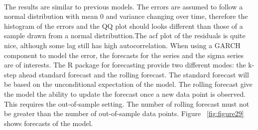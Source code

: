 \documentclass[12pt]{article}
\begin{document}
\paragraph{}
The results are similar to previous models. The errors are assumed to follow a normal distribution with mean 0 and variance changing over time, therefore the histogram of the errors and the QQ plot should looks different than those of a sample drawn from a normal distributtion.The acf plot of the residuals is quite nice, although some lag still has high autocorrelation. When using a GARCH component to model the error, the forecasts for the series and the sigma series are of interests. The R package for forecasting provide two different modes: the k-step ahead standard forecast and the rolling forecast. The standard forecast will be based on the unconditional expectation of the model. The rolling forecast give the model the ability to update the forecast once a new data point is observed. This requires the out-of-sample setting. The number of rolling forecast must not be greater than the number of out-of-sample data points. Figure ~\ref{fig:figure29} shows forecasts of the model.
\end{document}

